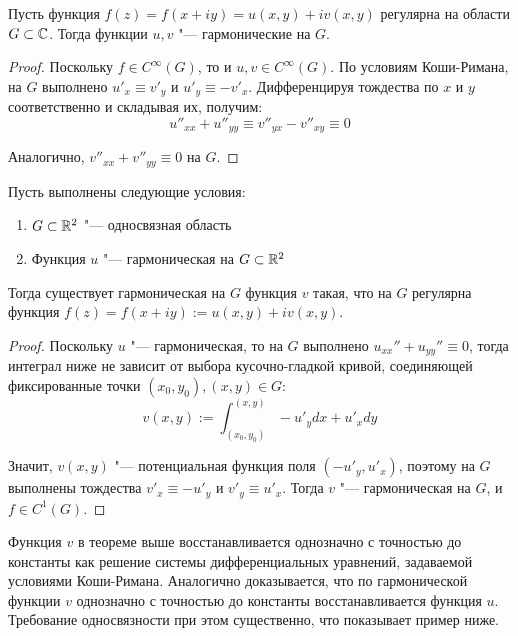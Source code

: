 \begin{proposition}
	Пусть функция $f(z) = f(x + iy) = u(x, y) + iv(x, y)$ регулярна на области $G \subset \mathbb{C}$. Тогда функции $u, v$ "--- гармонические на $G$.
\end{proposition}

\begin{proof}
	Поскольку $f \in C^\infty(G)$, то и $u, v \in C^\infty(G)$. По условиям Коши-Римана, на $G$ выполнено $u'_x \equiv v'_y$ и $u'_y \equiv -v'_x$. Дифференцируя тождества по $x$ и $y$ соответственно и складывая их, получим:
	\[u''_{xx} + u''_{yy} \equiv v''_{yx} - v''_{xy} \equiv 0\]
	
	Аналогично, $v''_{xx} + v''_{yy} \equiv 0$ на $G$.
\end{proof}

\begin{proposition}
	Пусть выполнены следующие условия:
	\begin{enumerate}
		\item $G \subset \mathbb{R}^2$ "--- односвязная область
		\item Функция $u$ "--- гармоническая на $G \subset \mathbb{R}^2$
	\end{enumerate}
	
	Тогда существует гармоническая на $G$ функция $v$ такая, что на $G$ регулярна функция $f(z) = f(x + iy) := u(x, y) + iv(x, y)$.
\end{proposition}

\begin{proof}
	Поскольку $u$ "--- гармоническая, то на $G$ выполнено $u_{xx}'' + u_{yy}'' \equiv 0$, тогда интеграл ниже не зависит от выбора кусочно-гладкой кривой, соединяющей фиксированные точки $(x_0, y_0), (x, y) \in G$:
	\[v(x, y) := \int_{(x_0, y_0)}^{(x, y)}-u'_ydx + u'_xdy\]
	
	Значит, $v(x, y)$ "--- потенциальная функция поля $(-u'_y, u'_x)$, поэтому на $G$ выполнены тождества $v'_x \equiv -u'_y$ и $v'_y \equiv u'_x$. Тогда $v$ "--- гармоническая на $G$, и $f \in C^1(G)$.
\end{proof}

\begin{note}
	Функция $v$ в теореме выше восстанавливается однозначно с точностью до константы как решение системы дифференциальных уравнений, задаваемой условиями Коши-Римана. Аналогично доказывается, что по гармонической функции $v$ однозначно с точностью до константы восстанавливается функция $u$. Требование односвязности при этом существенно, что показывает пример ниже.
\end{note}

